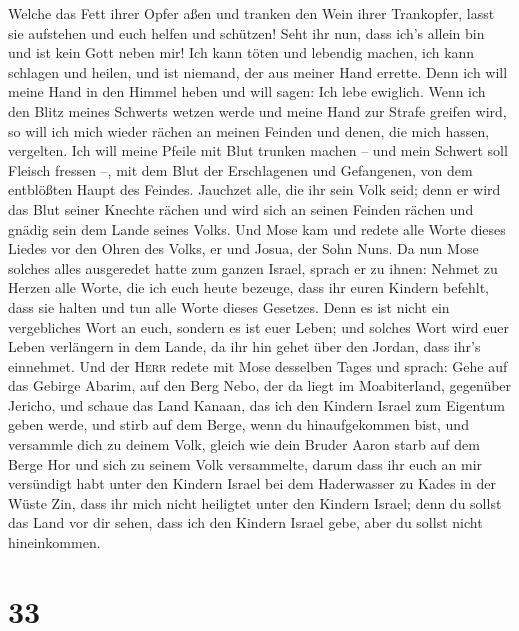  Welche das Fett ihrer Opfer aßen und tranken den Wein
ihrer Trankopfer, lasst sie aufstehen und euch helfen und schützen!
 Seht ihr nun, dass ich's allein bin und ist kein Gott
neben mir! Ich kann töten und lebendig machen, ich kann schlagen und
heilen, und ist niemand, der aus meiner Hand errette. 
Denn ich will meine Hand in den Himmel heben und will sagen: Ich lebe
ewiglich.  Wenn ich den Blitz meines Schwerts wetzen
werde und meine Hand zur Strafe greifen wird, so will ich mich wieder
rächen an meinen Feinden und denen, die mich hassen, vergelten.
 Ich will meine Pfeile mit Blut trunken machen -- und
mein Schwert soll Fleisch fressen --, mit dem Blut der Erschlagenen und
Gefangenen, von dem entblößten Haupt des Feindes. 
Jauchzet alle, die ihr sein Volk seid; denn er wird das Blut seiner
Knechte rächen und wird sich an seinen Feinden rächen und gnädig sein
dem Lande seines Volks.  Und Mose kam und redete alle
Worte dieses Liedes vor den Ohren des Volks, er und Josua, der Sohn
Nuns.  Da nun Mose solches alles ausgeredet hatte zum
ganzen Israel,  sprach er zu ihnen: Nehmet zu Herzen alle
Worte, die ich euch heute bezeuge, dass ihr euren Kindern befehlt, dass
sie halten und tun alle Worte dieses Gesetzes.  Denn es
ist nicht ein vergebliches Wort an euch, sondern es ist euer Leben; und
solches Wort wird euer Leben verlängern in dem Lande, da ihr hin gehet
über den Jordan, dass ihr's einnehmet.  Und der
\textsc{Herr} redete mit Mose desselben Tages und sprach:
 Gehe auf das Gebirge Abarim, auf den Berg Nebo, der da
liegt im Moabiterland, gegenüber Jericho, und schaue das Land Kanaan,
das ich den Kindern Israel zum Eigentum geben werde,  und
stirb auf dem Berge, wenn du hinaufgekommen bist, und versammle dich zu
deinem Volk, gleich wie dein Bruder Aaron starb auf dem Berge Hor und
sich zu seinem Volk versammelte,  darum dass ihr euch an
mir versündigt habt unter den Kindern Israel bei dem Haderwasser zu
Kades in der Wüste Zin, dass ihr mich nicht heiligtet unter den Kindern
Israel;  denn du sollst das Land vor dir sehen, dass ich
den Kindern Israel gebe, aber du sollst nicht hineinkommen.

\hypertarget{section-32}{%
\section{33}\label{section-32}}

